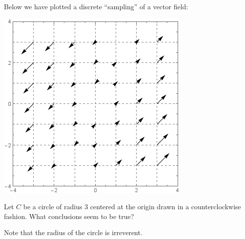 \documentclass{ximera}
\begin{document}
\begin{exercise}
  Below we have plotted a discrete ``sampling'' of a vector field:
  \begin{image}
    \includegraphics{divField3.png}
  \end{image}
  Let $C$ be a circle of radius $3$ centered at the origin drawn in a
  counterclockwise fashion.  What conclusions seem to be true?
  \begin{selectAll}
  \end{selectAll}
  \begin{hint}
    Note that the radius of the circle is irreverent. 
  \end{hint}
\end{exercise}
\end{document}
